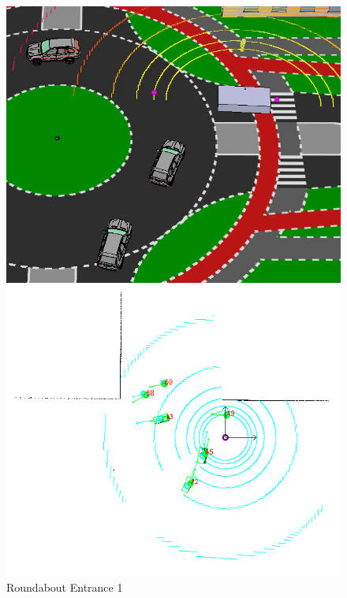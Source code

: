 \documentclass[11pt,oneside,openright]{mpreport}
\begin{document}
\begin{figure}[htb]
  \caption{Roundabout Entrance 1} 
    \centering
    \begin{minipage}[t]{0.49\textwidth}
        \centering
          \includegraphics[width=\textwidth]{bilder/sim01.png}
    \end{minipage}%
    \hfill
    \begin{minipage}[t]{0.49\textwidth}
        \centering
	\includegraphics[width=\textwidth]{bilder/sim02.png}
    \end{minipage}
    \label{roundabout_entrance_1}
\end{figure}
\end{document}
